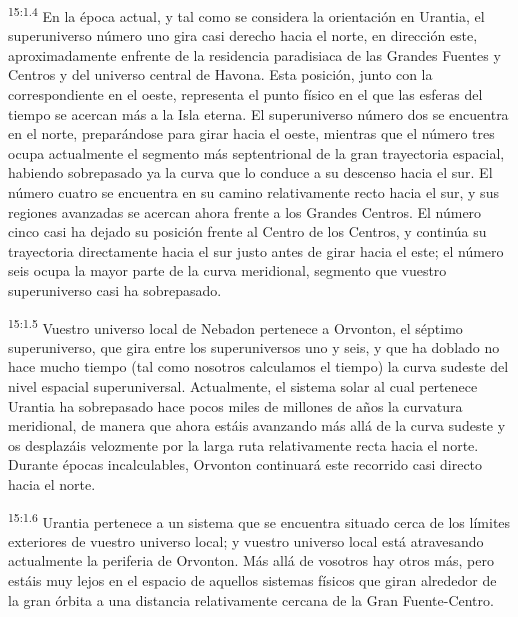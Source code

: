 \par
\textsuperscript{15:1.4} En la época actual, y tal como se considera la orientación en Urantia, el superuniverso número uno gira casi derecho hacia el norte, en dirección este, aproximadamente enfrente de la residencia paradisiaca de las Grandes Fuentes y Centros y del universo central de Havona. Esta posición, junto con la correspondiente en el oeste, representa el punto físico en el que las esferas del tiempo se acercan más a la Isla eterna. El superuniverso número dos se encuentra en el norte, preparándose para girar hacia el oeste, mientras que el número tres ocupa actualmente el segmento más septentrional de la gran trayectoria espacial, habiendo sobrepasado ya la curva que lo conduce a su descenso hacia el sur. El número cuatro se encuentra en su camino relativamente recto hacia el sur, y sus regiones avanzadas se acercan ahora frente a los Grandes Centros. El número cinco casi ha dejado su posición frente al Centro de los Centros, y continúa su trayectoria directamente hacia el sur justo antes de girar hacia el este; el número seis ocupa la mayor parte de la curva meridional, segmento que vuestro superuniverso casi ha sobrepasado.

\par
\textsuperscript{15:1.5} Vuestro universo local de Nebadon pertenece a Orvonton, el séptimo superuniverso, que gira entre los superuniversos uno y seis, y que ha doblado no hace mucho tiempo (tal como nosotros calculamos el tiempo) la curva sudeste del nivel espacial superuniversal. Actualmente, el sistema solar al cual pertenece Urantia ha sobrepasado hace pocos miles de millones de años la curvatura meridional, de manera que ahora estáis avanzando más allá de la curva sudeste y os desplazáis velozmente por la larga ruta relativamente recta hacia el norte. Durante épocas incalculables, Orvonton continuará este recorrido casi directo hacia el norte.

\par
\textsuperscript{15:1.6} Urantia pertenece a un sistema que se encuentra situado cerca de los límites exteriores de vuestro universo local; y vuestro universo local está atravesando actualmente la periferia de Orvonton. Más allá de vosotros hay otros más, pero estáis muy lejos en el espacio de aquellos sistemas físicos que giran alrededor de la gran órbita a una distancia relativamente cercana de la Gran Fuente-Centro.

